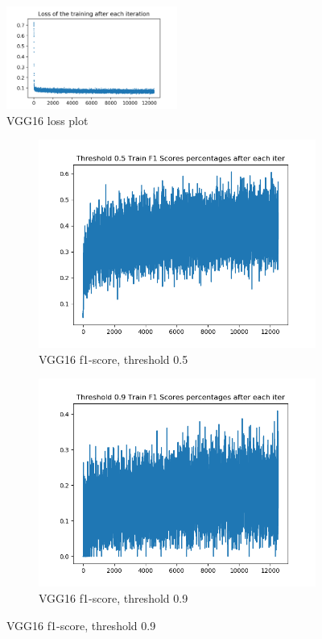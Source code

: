 \documentclass[12pt]{article}
\begin{document}
\begin{figure}[!ht]
\centering
\includegraphics[width=0.5\textwidth]{vgg16-full-lazy-1-train-loss.png}
\caption{\label{vgg16:vgg16-full-train-loss}VGG16 loss plot}
\end{figure}

\begin{figure}[!ht]
\centering
\begin{subfigure}{.5\textwidth}
	\centering
	\includegraphics[width=1\linewidth]{vgg16-full-lazy-1-train-scores-f1-5.png}
	\caption{\label{vgg16:vgg16-full-lazy-1-train-scores-f1-5}VGG16 f1-score, threshold 0.5}
\end{subfigure}%
\begin{subfigure}{.5\textwidth}
	\centering
	\includegraphics[width=1\linewidth]{vgg16-full-lazy-1-train-scores-f1-9.png}
	\caption{\label{vgg16:vgg16-full-lazy-1-train-scores-f1-9}VGG16 f1-score, threshold 0.9}
\end{subfigure}
\end{figure}
\end{document}

